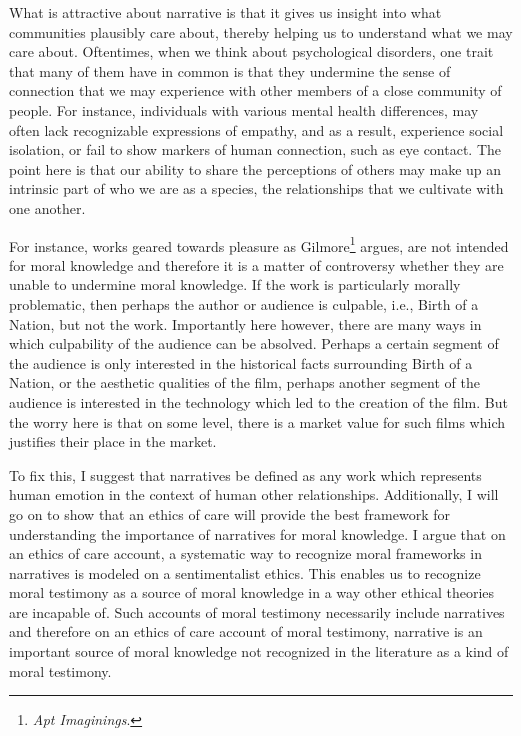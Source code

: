 \documentclass[
  12pt,
]{book}
\theoremstyle{definition}
\theoremstyle{definition}
\theoremstyle{definition}
\theoremstyle{definition}
\theoremstyle{remark}
\begin{document}
What is attractive about narrative is that it gives us insight into what communities plausibly care about, thereby helping us to understand what we may care about. Oftentimes, when we think about psychological disorders, one trait that many of them have in common is that they undermine the sense of connection that we may experience with other members of a close community of people. For instance, individuals with various mental health differences, may often lack recognizable expressions of empathy, and as a result, experience social isolation, or fail to show markers of human connection, such as eye contact. The point here is that our ability to share the perceptions of others may make up an intrinsic part of who we are as a species, the relationships that we cultivate with one another.

For instance, works geared towards pleasure as Gilmore\footnote{\emph{Apt {Imaginings}}.} argues, are not intended for moral knowledge and therefore it is a matter of controversy whether they are unable to undermine moral knowledge. If the work is particularly morally problematic, then perhaps the author or audience is culpable, i.e., Birth of a Nation, but not the work. Importantly here however, there are many ways in which culpability of the audience can be absolved. Perhaps a certain segment of the audience is only interested in the historical facts surrounding Birth of a Nation, or the aesthetic qualities of the film, perhaps another segment of the audience is interested in the technology which led to the creation of the film. But the worry here is that on some level, there is a market value for such films which justifies their place in the market.

To fix this, I suggest that narratives be defined as any work which represents human emotion in the context of human other relationships. Additionally, I will go on to show that an ethics of care will provide the best framework for understanding the importance of narratives for moral knowledge. I argue that on an ethics of care account, a systematic way to recognize moral frameworks in narratives is modeled on a sentimentalist ethics. This enables us to recognize moral testimony as a source of moral knowledge in a way other ethical theories are incapable of. Such accounts of moral testimony necessarily include narratives and therefore on an ethics of care account of moral testimony, narrative is an important source of moral knowledge not recognized in the literature as a kind of moral testimony.
\end{document}
